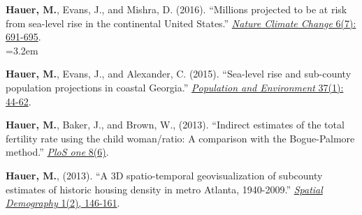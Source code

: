 \begin{etaremune}
\item \textbf{Hauer, M.}, Evans, J., and Mishra, D. (2016). ``Millions projected to be at risk from sea-level rise in the continental United States.'' \href{http://www.nature.com/nclimate/journal/v6/n7/full/nclimate2961.html}{\textit{Nature Climate Change} 6(7): 691-695}.\\
            \hangindent=3.2em

\item \textbf{Hauer, M.}, Evans, J., and Alexander, C. (2015). ``Sea-level rise and sub-county population projections in coastal Georgia.''  \href{http://link.springer.com/article/10.1007/s11111-015-0233-8}{\textit{Population and Environment} 37(1): 44-62}.\\

\item \textbf{Hauer, M.}, Baker, J., and Brown, W., (2013). ``Indirect estimates of the total fertility rate using the child                        woman/ratio: A comparison with the Bogue-Palmore method.'' \href{http://journals.plos.org/plosone/article?id=10.1371/journal.pone.0067226}{\textit{PloS one} 8(6)}.\\

\item \textbf{Hauer, M.}, (2013). ``A 3D spatio-temporal geovisualization of subcounty estimates of historic housing density in metro Atlanta, 1940-2009.'' \href{http://link.springer.com/article/10.1007/BF03354895}{\textit{Spatial Demography} 1(2), 146-161}.\\

 \end{etaremune}


